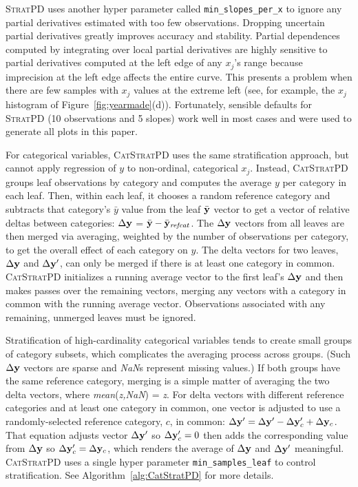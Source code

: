 \documentclass{article}
\newcommand{\figref}[1]{Figure~\ref{#1}}
\newcommand{\algref}[1]{Algorithm~\ref{#1}}
\newcommand{\spd}{\fontfamily{cmr}\textsc{\small StratPD}}
\newcommand{\cspd}{\fontfamily{cmr}\textsc{\small CatStratPD}}
\begin{document}
\spd{} uses another hyper parameter called {\tt\small min\_slopes\_per\_x} to ignore any partial derivatives estimated with too few observations.  Dropping uncertain partial derivatives greatly improves accuracy and stability. Partial dependences computed by integrating over local partial derivatives are highly sensitive to partial derivatives computed at the left edge of any $x_j$'s range because imprecision at the left edge affects the entire curve.  This presents a problem when there are few samples with $x_j$ values at the extreme left (see, for example, the $x_j$ histogram of \figref{fig:yearmade}(d)).  Fortunately, sensible defaults for \spd{} (10 observations and 5 slopes) work well in most cases and  were used to generate all plots in this paper.

For categorical variables, \cspd{} uses the same stratification approach, but cannot apply  regression of $y$ to non-ordinal, categorical $x_j$. Instead, \cspd{} groups leaf observations by category and computes the average $y$ per category in each leaf. Then,  within each leaf, it chooses a random reference category and subtracts that category's $\bar{y}$ value from the leaf $\bar{\bf y}$ vector to get a vector of relative deltas between categories: $\Delta {\bf y}$ = $\bar{\bf y} - \bar{\bf y}_{\it refcat}$. The $\Delta  {\bf y}$ vectors from all leaves are then merged via averaging, weighted by the number of observations per category, to get the overall effect of each category on $y$.  The delta vectors for two leaves, $\Delta {\bf y}$ and $\Delta {\bf y}'$, can only be merged if there is at least one category in common.  \cspd{} initializes a running average vector to the first leaf's $\Delta  {\bf y}$ and then makes  passes over the remaining vectors, merging any vectors with a category in common with the running average vector.  Observations associated with any remaining, unmerged leaves must be ignored.

Stratification of high-cardinality categorical variables tends to create small groups of category subsets, which complicates the averaging process across groups. (Such $\Delta {\bf y}$ vectors are sparse and {\it NaN}s represent missing values.) If both groups have the same reference category, merging is a simple matter of averaging the two delta vectors, where {\it mean}({\it z,NaN}) = {\it z}.  For delta vectors with different reference categories and at least one category in common, one vector is adjusted to use a randomly-selected reference category, $c$, in common: $\Delta {\bf y}' = \Delta {\bf y}' - \Delta {\bf y}_c' + \Delta {\bf y}_c$. That equation adjusts vector $\Delta {\bf y}'$ so $\Delta {\bf y}_c'=0$ then adds the corresponding value from $\Delta {\bf y}$ so $\Delta {\bf y}_c' = \Delta {\bf y}_c$, which renders the average of $\Delta {\bf y}$ and $\Delta {\bf y}'$ meaningful.  \cspd{} uses a single hyper parameter {\tt\small min\_samples\_leaf} to control stratification. See \algref{alg:CatStratPD} for more details.
\end{document}
